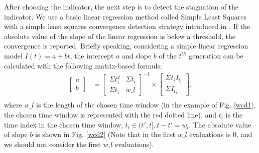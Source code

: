 \documentclass[conference]{IEEEtran}
\begin{document}
After choosing the indicator, the next step is to detect the stagnation of the indicator.
We use a basic linear regression method called Simple Least Squares\cite{SimpleLeastSquares} with a
simple least squares convergence detection strategy introduced in \cite{convergenceDetection:LSSC}.
If the absolute value of the slope of the linear regression is below a threshold, the convergence is reported.
Briefly speaking, considering a simple linear regression model $I(t)=a+bt$, 
the intercept $a$ and slope $b$ of the $t^{th}$ generation can be calculated 
with the following matrix-based formula:
\begin{equation}\begin{aligned}\label{elr1}
  \left[
    \begin{matrix}
      a \\
      b
    \end{matrix}
  \right]
  &= 
  \left[
    \begin{matrix}
      \Sigma t_i^2 & \Sigma t_i \\
      \Sigma t_i   & w\_l 
    \end{matrix}
  \right]^{-1}
  \times
  \left[
    \begin{matrix}
      \Sigma t_i I_{t_i} \\
      \Sigma I_{t_i} 
    \end{matrix}
  \right], \\
\end{aligned}
\end{equation}
where $w\_ l$ is the length of the chosen time window
(in the example of Fig. \ref{wcd1}, the chosen time window is represented with the red dotted line), 
and $t_i$ is the time index in the chosen time window, $t_i \in (t',t], t - t' = w_l$.
The absolute value of slope $b$ is shown in Fig. \ref{wcd2} 
(Note that in the first $w\_ l$ evaluations is 0, 
and we should not consider the first $w\_ l$ evaluations). 
\end{document}
